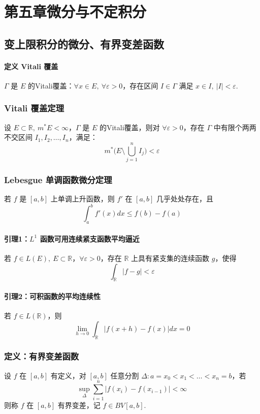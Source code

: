 \documentclass{article}
\begin{document}
	\section{第五章\quad 微分与不定积分}
	\subsection{变上限积分的微分、有界变差函数}
	\paragraph{定义 Vitali 覆盖}
	$\Gamma$ 是 $E$ 的Vitali覆盖：$\forall x\in E,\ \forall \varepsilon>0$，存在区间 $I\in\Gamma$ 满足 $x\in I,\ |I|<\varepsilon$.
	
	\subsubsection{Vitali 覆盖定理}
	设 $E\subset\mathbb{R},\ m^*E<\infty$，$\Gamma$ 是 $E$ 的Vitali覆盖，则对 $\forall \varepsilon>0$，存在 $\Gamma$ 中有限个两两不交区间 $I_1,I_2,\dots,I_n$，满足：
	\[
	\displaystyle m^*\Big(E\setminus \bigcup_{j=1}^n I_j\Big) < \varepsilon
	\]
	
	\subsubsection{Lebesgue 单调函数微分定理}
	若 $f$ 是 $[a,b]$ 上单调上升函数，则 $f'$ 在 $[a,b]$ 几乎处处存在，且
	\[
	\displaystyle \int_a^b f'(x) dx \le f(b)-f(a)
	\]
	
	\paragraph{引理1：$L^1$ 函数可用连续紧支函数平均逼近}
	若 $f\in L(E),\ E\subset\mathbb{R}$，$\forall \varepsilon>0$，存在 $\mathbb{R}$ 上具有紧支集的连续函数 $g$，使得
	\[
	\displaystyle \int_{\mathbb{R}} |f-g| < \varepsilon
	\]
	
	\paragraph{引理2：可积函数的平均连续性}
	若 $f\in L(\mathbb{R})$，则
	\[
	\displaystyle \lim_{h\to0}\int_{\mathbb{R}} |f(x+h)-f(x)| dx = 0
	\]
	
	\subsubsection{定义：有界变差函数}
	设 $f$ 在 $[a,b]$ 有定义，对 $[a,b]$ 任意分割 $\Delta:a=x_0<x_1<\dots<x_n=b$，若
	\[
	\sup_{\Delta} \sum_{i=1}^n |f(x_i)-f(x_{i-1})| < \infty
	\]
	则称 $f$ 在 $[a,b]$ 有界变差，记 $f\in BV[a,b]$.
	
\end{document}
